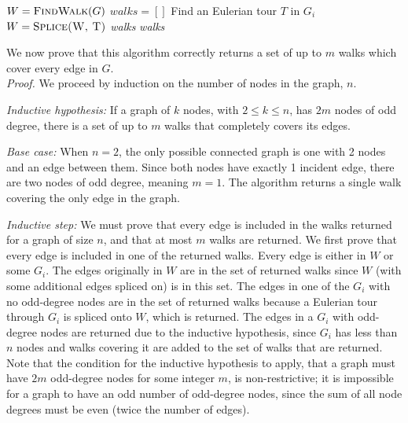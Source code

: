 \documentclass{article}
\begin{document}
\begin{enumerate}[label=(\alph*)]
    \begin{algorithm}
        \begin{algorithmic}[1]
        \State \Return {}
        \EndIf
        \State $W = \Call{FindWalk}{G}$
        \State $walks = []$
        \State {}
                \State Find an Eulerian tour $T$ in $G_i$
                \State $W = \textproc{Splice(W, T)}$
            \Else
                \State {}  \textit{walks}
            \EndIf
        \EndFor
        \State {}
        \State \Return \textit{walks}
        \EndFunction
        \end{algorithmic}
    \end{algorithm}
    
We now prove that this algorithm correctly returns a set of up to $m$ walks which cover every edge in $G$.\\

\textit{Proof.} We proceed by induction on the number of nodes in the graph, $n$. 

\textit{Inductive hypothesis:} If a graph of $k$ nodes, with $2 \leq k \le n$, has $2m$ nodes of odd degree, there is a set of up to $m$ walks that completely covers its edges.

\textit{Base case:} When $n=2$, the only possible connected graph is one with 2 nodes and an edge between them. Since both nodes have exactly 1 incident edge, there are two nodes of odd degree, meaning $m=1$. The algorithm returns a single walk covering the only edge in the graph.

\textit{Inductive step:} We must prove that every edge is included in the walks returned for a graph of size $n$, and that at most $m$ walks are returned. We first prove that every edge is included in one of the returned walks. Every edge is either in $W$ or some $G_i$. The edges originally in $W$ are in the set of returned walks since $W$ (with some additional edges spliced on) is in this set. The edges in one of the $G_i$ with no odd-degree nodes are in the set of returned walks because a Eulerian tour through $G_i$ is spliced onto $W$, which is returned. The edges in a $G_i$ with odd-degree nodes are returned due to the inductive hypothesis, since $G_i$ has less than $n$ nodes and walks covering it are added to the set of walks that are returned. Note that the condition for the inductive hypothesis to apply, that a graph must have $2m$ odd-degree nodes for some integer $m$, is non-restrictive; it is impossible for a graph to have an odd number of odd-degree nodes, since the sum of all node degrees must be even (twice the number of edges). \\


\end{enumerate}
\end{document}

